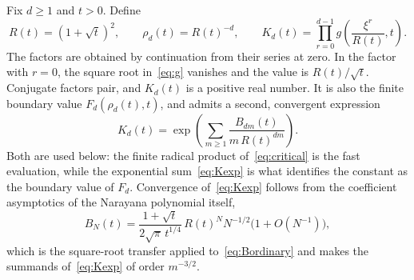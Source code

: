 \documentclass[11pt]{article}
\numberwithin{equation}{section}
\theoremstyle{definition}
\begin{document}
Fix $d\geq1$ and $t>0$. Define
\begin{equation}
 R(t)=(1+\sqrt t)^2,\qquad \rho_d(t)=R(t)^{-d},\qquad
 K_d(t)=\prod_{r=0}^{d-1}g\!\left(\frac{\xi^r}{R(t)},t\right).
 \label{eq:critical}
\end{equation}
The factors are obtained by continuation from their series at zero. In the
factor with $r=0$, the square root in~\eqref{eq:g} vanishes and the value is
$R(t)/\sqrt t$. Conjugate factors pair, and $K_d(t)$ is a positive real
number. It is also the finite boundary value $F_d(\rho_d(t),t)$, and admits a
second, convergent expression
\begin{equation}
 K_d(t)=\exp\left(\sum_{m\geq1}\frac{B_{dm}(t)}{m\,R(t)^{dm}}\right).
 \label{eq:Kexp}
\end{equation}
Both are used below: the finite radical product of~\eqref{eq:critical} is the
fast evaluation, while the exponential sum~\eqref{eq:Kexp} is what identifies
the constant as the boundary value of $F_d$. Convergence of~\eqref{eq:Kexp}
follows from the coefficient asymptotics of the Narayana polynomial itself,
\begin{equation}
 B_N(t)=\frac{1+\sqrt t}{2\sqrt\pi\,t^{1/4}}\,R(t)^NN^{-1/2}
        \bigl(1+O(N^{-1})\bigr),
 \label{eq:Basymp}
\end{equation}
which is the square-root transfer applied to~\eqref{eq:Bordinary} and makes
the summands of~\eqref{eq:Kexp} of order $m^{-3/2}$.
\end{document}
